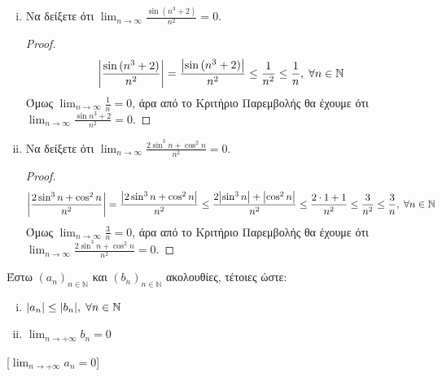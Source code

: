 \documentclass[a4paper,table]{report}
\begin{document}
\begin{examples}
\item {}
  \begin{enumerate}[i)]
    \item Να δείξετε ότι $ \lim_{n \to \infty} \frac{\sin{(n^{3}+2)}}{n^{2}} = 0 $. 
      \begin{proof}
        \[
          \abs{\frac{\sin{(n^{3}+2)}}{n^{2}}} = \frac{\abs{\sin{(n^{3}+2)}}}{n^{2}} \leq
          \frac{1}{n^{2}} \leq \frac{1}{n} , \; \forall n \in \mathbb{N}
        \] 
        Όμως $ \lim_{n \to \infty} \frac{1}{n} = 0 $, άρα από το Κριτήριο Παρεμβολής θα
        έχουμε ότι $ \lim_{n \to \infty} \frac{\sin{n^{3}+2}}{n^{2}} = 0 $.
      \end{proof}

    \item Να δείξετε ότι $ \lim_{n \to \infty} \frac{2 \sin^{3}{n} + 
      \cos^{2}{n}}{n^{2}} =0 $.  
      \begin{proof} 
        \[
          \abs{\frac{2 \sin^{3}{n} +\cos^{2}{n}}{n^{2}}} = \frac{\abs{2 \sin^{3}{n}
            + \cos^{2}{n}}}{n^{2}} \leq \frac{2 \abs{\sin^{3}{n}}+ 
          \abs{\cos^{2}{n}}}{n^{2}} \leq \frac{2\cdot 1 + 1}{n^{2}} \leq
          \frac{3}{n^{2}} \leq \frac{3}{n} ,  
          \; \forall n \in \mathbb{N}
        \] 
        Όμως $ \lim_{n \to \infty} \frac{3}{n} = 0 $, άρα από το Κριτήριο Παρεμβολής θα
        έχουμε ότι $ \lim_{n \to \infty} \frac{2 \sin^{3}{n} + 
        \cos^{2}{n}}{n^{2}} = 0 $.
      \end{proof}

  \end{enumerate}
\end{examples}

\begin{cor}
  Έστω $ (a_{n})_{n \in \mathbb{N}} $ και $ 
  (b_{n})_{n \in \mathbb{N}} $ ακολουθίες, τέτοιες ώστε: 

  \vspace{\baselineskip}

  \begin{minipage}{0.25\textwidth}
    \begin{enumerate}[i)]
      \item $ \abs{a_{n}} \leq \abs{b_{n}}, \; \forall n \in 
        \mathbb{N} $ \hfill {}
      \item $ \lim_{n \to +\infty} b_{n} = 0$ \hfill {}
    \end{enumerate}
  \end{minipage}

  [$ \lim_{n \to +\infty} a_{n} = 0 $]
\end{cor}
\end{document}
